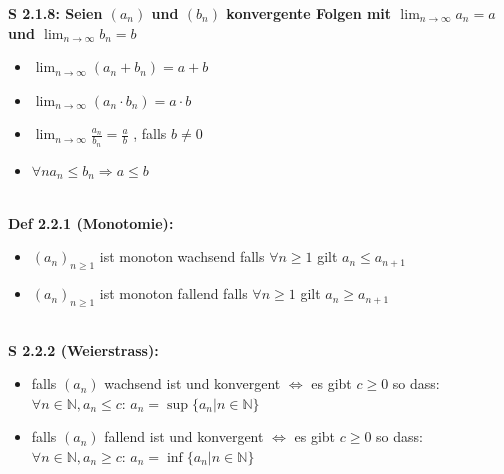 \documentclass[7pt,landscape, margin = 0.1mm]{article}
\newcommand{\DEF}[2]{\color{chaptercolor}\bf{Def #1}:\color{black}    \hspace{0.2cm} #2 \\}
\newcommand{\SA}[2]{\color{chaptercolor}\bf{S #1}:\color{black}    \hspace{0.2cm} #2 \\}
\begin{document}
\begin{multicols}{4}
\begin{flushleft}
\SA{2.1.8}{
Seien $(a_n)$ und $(b_n)$ konvergente Folgen mit $\lim_{n \rightarrow \infty} a_n = a$ und $\lim_{n \rightarrow \infty} b_n = b$
\begin{itemize}

\item[1.] $\lim_{n \rightarrow \infty}(a_n+b_n) = a+ b$
\item[2.] $\lim_{n \rightarrow \infty} (a_n \cdot b_n) = a\cdot b$
\item[3.] $\lim_{n \rightarrow \infty} \frac{a_n}{b_n} = \frac{a}{b}$ , falls $b \neq 0$
\item[4.] $\forall n a_n \leq b_n \Rightarrow a \leq b$  \end{itemize}}
\DEF{2.2.1 (Monotomie)}{\begin{itemize}\item[1.] $(a_n)_{n \geq 1}$ ist monoton wachsend falls $\forall n \geq 1$ gilt $a_n \leq a_{n+1}$
\item[2.] $(a_n)_{n\geq 1}$ ist monoton fallend falls $\forall n \geq 1$ gilt $a_n \geq a_{n+1}$ \end{itemize}}
\SA{2.2.2 (Weierstrass)}{\begin{itemize}
\item[1.] falls $(a_n)$ wachsend ist und konvergent $\Leftrightarrow$ es gibt $c \geq 0$ so dass:
  $\forall n \in \mathbb{N}, a_n \leq c$: $a_n = \sup \{a_n | n \in \mathbb{N} \}$
\item[2.] falls $(a_n)$ fallend ist und konvergent $\Leftrightarrow$ es gibt $c \geq 0$ so dass:
$\forall n \in \mathbb{N}, a_n \geq c$: $a_n = \inf \{a_n | n \in \mathbb{N} \}$


\end{itemize}}
\end{flushleft}
\end{multicols}
\end{document}
